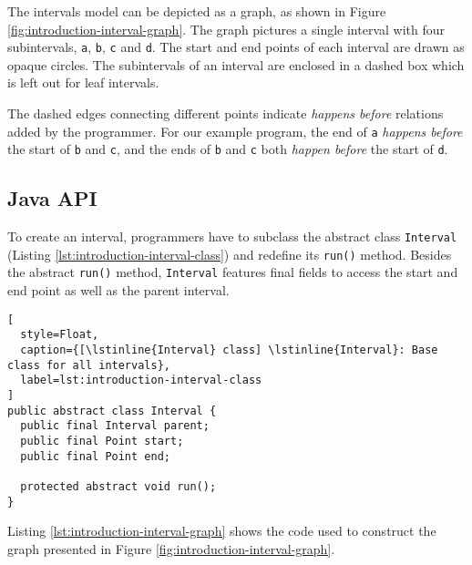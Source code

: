 The intervals model can be depicted as a graph, as shown in Figure
\ref{fig:introduction-interval-graph}. The graph pictures a single
interval with four subintervals, \lstinline!a!, \lstinline!b!,
\lstinline!c! and \lstinline!d!. The start and end points of each
interval are drawn as opaque circles. The subintervals of an interval
are enclosed in a dashed box which is left out for leaf intervals.

The dashed edges connecting different points indicate \emph{happens
  before} relations added by the programmer. For our example program,
the end of \lstinline!a! \emph{happens before} the start of
\lstinline!b! and \lstinline!c!, and the ends of \lstinline!b! and
\lstinline!c! both \emph{happen before} the start of \lstinline!d!.

\subsection{Java API}
\label{sec:intro-intervals-java-api}

To create an interval, programmers have to subclass the abstract class
\lstinline!Interval! (Listing \ref{lst:introduction-interval-class})
and redefine its \lstinline!run()! method. Besides the abstract
\lstinline!run()! method, \lstinline!Interval! features final fields
to access the start and end point as well as the parent interval.

\begin{lstlisting}[
  style=Float, 
  caption={[\lstinline{Interval} class] \lstinline{Interval}: Base class for all intervals},
  label=lst:introduction-interval-class
]
public abstract class Interval {
  public final Interval parent;
  public final Point start;
  public final Point end;

  protected abstract void run();
}
\end{lstlisting}

Listing \ref{lst:introduction-interval-graph} shows the code used to
construct the graph presented in Figure
\ref{fig:introduction-interval-graph}.

